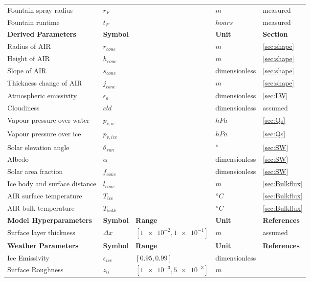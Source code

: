 \documentclass[utf8]{frontiersSCNS}
\begin{document}
\begin{table}
\begin{tabular}{lllll}
    Fountain spray radius & $r_{F}$             &             & $m$& measured \\
    Fountain runtime & $t_{F}$             &             &  $hours$ & measured \\\midrule
		\textbf{Derived Parameters} & \textbf{Symbol} & \textbf{} & \textbf{Unit} & \textbf{Section} \\
    Radius of AIR & $r_{cone}$ &  & $m$ & \ref{sec:shape}\\
    Height of AIR & $h_{cone}$ &  & $m$ & \ref{sec:shape}\\
    Slope of AIR  & $s_{cone}$ &  & dimensionless & \ref{sec:shape}\\
    Thickness change of AIR  & $j_{cone}$ &  & $m$  & \ref{sec:shape}\\
    Atmospheric emissivity & $\epsilon_{a}$ & & dimensionless    & \ref{sec:LW}\\
    Cloudiness & $cld$ &  & dimensionless  & assumed\\
    Vapour pressure over water & $p_{v,w}$ &  & $hPa$  & \ref{sec:Qs}\\
    Vapour pressure over ice & $p_{v,ice}$ &  & $hPa$ & \ref{sec:Qs}\\
    Solar elevation angle & $\theta_{sun}$ &  & $\degree$ & \ref{sec:SW}\\
    Albedo & $\alpha$ &  & dimensionless & \ref{sec:SW}\\
    Solar area fraction& $f_{cone}$ &  & dimensionless & \ref{sec:SW}\\
    Ice body and surface distance & $l_{cone}$ &  & $m$  & \ref{sec:Bulkflux}\\
    AIR surface temperature & $T_{ice}$ &  & $\degree C$  & \ref{sec:Bulkflux}\\
    AIR bulk temperature & $T_{bulk}$ &  & $\degree C$  & \ref{sec:Bulkflux}\\\midrule
		\textbf{Model Hyperparameters} & \textbf{Symbol} & \textbf{Range} & \textbf{Unit} & \textbf{References} \\
    Surface layer thickness             & $\Delta x$            & $[\num{1e-2},\num{1e-1}]$           & $m$ & assumed
    \\\midrule
		\textbf{Weather Parameters} & \textbf{Symbol} & \textbf{Range} & \textbf{Unit} & \textbf{References} \\
    Ice Emissivity                      & $\epsilon_{ice}$      & $[0.95,0.99]$         & dimensionless & \citeauthor{HORI2006486}             \\
    Surface Roughness                   & $z_0$                 & $[\num{1e-3},\num{5e-3}]$            & $m$  & \citeauthor{BrockWillisSharp_2006}       \\

\end{tabular}
\end{table}
\end{document}

